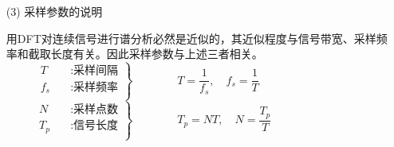 \documentclass[notheorems,compress,mathserif,table]{beamer}
\begin{document}
\begin{frame}[shrink]\frametitle{}%
\begin{enumerate}
	\item [(3)]采样参数的说明\par

        \qquad 用DFT对连续信号进行谱分析必然是近似的，其近似程度与信号带宽、采样频率和截取长度有关。因此采样参数与上述三者相关。
        \begin{equation*} %
            \left. \begin{aligned}
                T   \quad   &: \mbox{采样间隔}\\
                f_s \quad   &: \mbox{采样频率}\\
            \end{aligned}  \right\}
            \qquad\qquad   T = \frac{1}{f_s},\quad f_s = \frac{1}{T}    %
            \qquad \qquad\qquad\qquad\quad
        \end{equation*}
        \begin{equation*} %
            \left. \begin{aligned}
                N   \quad   &: \mbox{采样点数}\\
                T_p \quad   &: \mbox{信号长度}\\
            \end{aligned}  \right\}
            \qquad\qquad  T_p  =  NT,\quad  N = \frac{T_p}{T}    %
            \qquad \qquad\qquad\qquad
        \end{equation*}
\end{enumerate}        
\end{frame}




%
\end{document}
